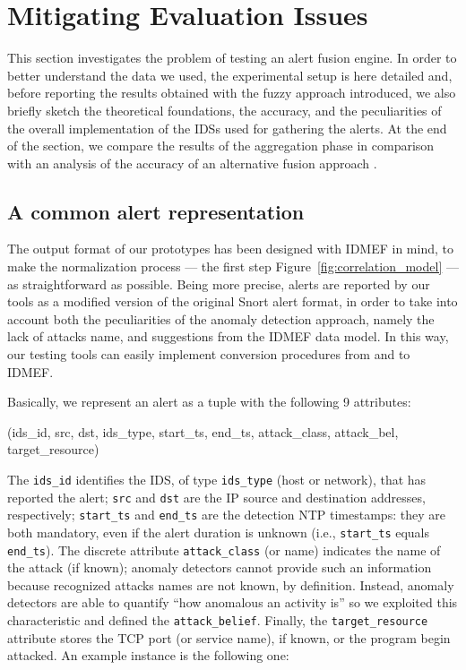 \section{Mitigating Evaluation Issues}
\label{correlation:evaluation}
This section investigates the problem of testing an alert fusion engine. In order to better understand the data we used, the experimental setup is here detailed and, before reporting the results obtained with the fuzzy approach introduced, we also briefly sketch the theoretical foundations, the accuracy, and the peculiarities of the overall implementation of the \acp{IDS} used for gathering the alerts. At the end of the section, we compare the results of the aggregation phase in comparison with an analysis of the accuracy of an alternative fusion approach \citep{dblp:conf/raid/qinl03}.

\subsection{A common alert representation}
\label{correlation:evaluation:representation}
The output format of our prototypes has been designed with \ac{IDMEF} in mind, to make the normalization process --- the first step Figure~\ref{fig:correlation_model} --- as straightforward as possible. Being more precise, alerts are reported by our tools as a modified version of the original \textsf{Snort} \citep{snortsite} alert format, in order to take into account both the peculiarities of the anomaly detection approach, namely the lack of attacks name, and suggestions from the \ac{IDMEF} data model. In this way, our testing tools can easily implement conversion procedures from and to \ac{IDMEF}.

Basically, we represent an alert as a tuple with the following 9 attributes:

\begin{center}\footnotesize\ttfamily
  (ids\_id, src, dst, ids\_type, start\_ts, end\_ts, attack\_class, attack\_bel, target\_resource)
\end{center}

The \texttt{ids\_id} identifies the \ac{IDS}, of type \texttt{ids\_type} (host or network), that has reported the alert; \texttt{src} and \texttt{dst} are the \ac{IP} source and destination addresses, respectively; \texttt{start\_ts} and \texttt{end\_ts} are the detection \ac{NTP} \citep{RFC1305} timestamps: they are both mandatory, even if the alert duration is unknown (i.e., \texttt{start\_ts} equals \texttt{end\_ts}). The discrete attribute \texttt{attack\_class} (or name) indicates the name of the attack (if known); anomaly detectors cannot provide such an information because recognized attacks names are not known, by definition. Instead, anomaly detectors are able to quantify ``how anomalous an activity is'' so we exploited this characteristic and defined the \texttt{attack\_belief}. Finally, the \texttt{target\_resource} attribute stores the \ac{TCP} port (or service name), if known, or the program begin attacked. An example instance is the following one:

